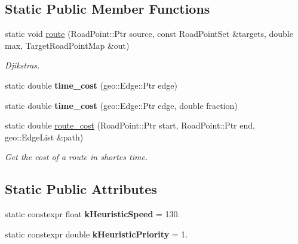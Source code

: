 \subsection*{Static Public Member Functions}
\begin{DoxyCompactItemize}
\item 
static void \hyperlink{classhmm__mm_1_1Router_ade72964f9d0c24520f76757cde903d5f}{route} (Road\+Point\+::\+Ptr source, const Road\+Point\+Set \&targets, double max, Target\+Road\+Point\+Map \&out)\hypertarget{classhmm__mm_1_1Router_ade72964f9d0c24520f76757cde903d5f}{}\label{classhmm__mm_1_1Router_ade72964f9d0c24520f76757cde903d5f}

\begin{DoxyCompactList}\small\item\em Djikstra\textquotesingle{}s. \end{DoxyCompactList}\item 
static double {\bfseries time\+\_\+cost} (geo\+::\+Edge\+::\+Ptr edge)\hypertarget{classhmm__mm_1_1Router_ab7e4e5cdcd1b5a327c07966c8da6ae39}{}\label{classhmm__mm_1_1Router_ab7e4e5cdcd1b5a327c07966c8da6ae39}

\item 
static double {\bfseries time\+\_\+cost} (geo\+::\+Edge\+::\+Ptr edge, double fraction)\hypertarget{classhmm__mm_1_1Router_a2662b5cff27c1e0011ba8d09cbaea5d4}{}\label{classhmm__mm_1_1Router_a2662b5cff27c1e0011ba8d09cbaea5d4}

\item 
static double \hyperlink{classhmm__mm_1_1Router_a087113186f15df2c7c462a45d5569325}{route\+\_\+cost} (Road\+Point\+::\+Ptr start, Road\+Point\+::\+Ptr end, geo\+::\+Edge\+List \&path)\hypertarget{classhmm__mm_1_1Router_a087113186f15df2c7c462a45d5569325}{}\label{classhmm__mm_1_1Router_a087113186f15df2c7c462a45d5569325}

\begin{DoxyCompactList}\small\item\em Get the cost of a route in shortes time. \end{DoxyCompactList}\end{DoxyCompactItemize}
\subsection*{Static Public Attributes}
\begin{DoxyCompactItemize}
\item 
static constexpr float {\bfseries k\+Heuristic\+Speed} = 130.\hypertarget{classhmm__mm_1_1Router_a28e87285dc841453be29c6ba6c27321c}{}\label{classhmm__mm_1_1Router_a28e87285dc841453be29c6ba6c27321c}

\item 
static constexpr double {\bfseries k\+Heuristic\+Priority} = 1.\hypertarget{classhmm__mm_1_1Router_ae03d10c778bceb74cef64aca2c7c19cd}{}\label{classhmm__mm_1_1Router_ae03d10c778bceb74cef64aca2c7c19cd}

\end{DoxyCompactItemize}


